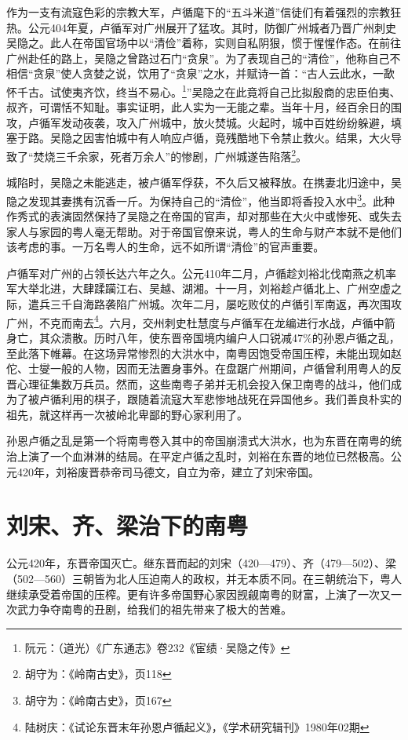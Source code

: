 作为一支有流寇色彩的宗教大军，卢循麾下的“五斗米道”信徒们有着强烈的宗教狂热。公元404年夏，卢循军对广州展开了猛攻。其时，防御广州城者乃晋广州刺史吴隐之。此人在帝国官场中以“清俭”着称，实则自私阴狠，惯于惺惺作态。在前往广州赴任的路上，吴隐之曾路过石门“贪泉”。为了表现自己的“清俭”，他称自己不相信“贪泉”使人贪婪之说，饮用了“贪泉”之水，并赋诗一首：“古人云此水，一歃怀千古。试使夷齐饮，终当不易心。\footnote{阮元：（道光）《广东通志》卷232《宦绩·吴隐之传》}”吴隐之在此竟将自己比拟殷商的忠臣伯夷、叔齐，可谓恬不知耻。事实证明，此人实为一无能之辈。当年十月，经百余日的围攻，卢循军发动夜袭，攻入广州城中，放火焚城。火起时，城中百姓纷纷躲避，填塞于路。吴隐之因害怕城中有人响应卢循，竟残酷地下令禁止救火。结果，大火导致了“焚烧三千余家，死者万余人”的惨剧，广州城遂告陷落\footnote{胡守为：《岭南古史》，页118}。

城陷时，吴隐之未能逃走，被卢循军俘获，不久后又被释放。在携妻北归途中，吴隐之发现其妻携有沉香一斤。为保持自己的“清俭”，他当即将香投入水中\footnote{胡守为：《岭南古史》，页167}。此种作秀式的表演固然保持了吴隐之在帝国的官声，却对那些在大火中或惨死、或失去家人与家园的粤人毫无帮助。对于帝国官僚来说，粤人的生命与财产本就不是他们该考虑的事。一万名粤人的生命，远不如所谓“清俭”的官声重要。

卢循军对广州的占领长达六年之久。公元410年二月，卢循趁刘裕北伐南燕之机率军大举北进，大肆蹂躏江右、吴越、湖湘。十一月，刘裕趁卢循北上、广州空虚之际，遣兵三千自海路袭陷广州城。次年二月，屡吃败仗的卢循引军南返，再次围攻广州，不克而南去\footnote{陆树庆：《试论东晋末年孙恩卢循起义》，《学术研究辑刊》1980年02期}。六月，交州刺史杜慧度与卢循军在龙编进行水战，卢循中箭身亡，其众溃散。历时八年，使东晋帝国境内编户人口锐减47\%的孙恩卢循之乱，至此落下帷幕。在这场异常惨烈的大洪水中，南粤因饱受帝国压榨，未能出现如赵佗、士燮一般的人物，因而无法置身事外。在盘踞广州期间，卢循曾利用粤人的反晋心理征集数万兵员。然而，这些南粤子弟并无机会投入保卫南粤的战斗，他们成为了被卢循利用的棋子，跟随着流寇大军悲惨地战死在异国他乡。我们善良朴实的祖先，就这样再一次被岭北卑鄙的野心家利用了。

孙恩卢循之乱是第一个将南粤卷入其中的帝国崩溃式大洪水，也为东晋在南粤的统治上演了一个血淋淋的结局。在平定卢循之乱时，刘裕在东晋的地位已然极高。公元420年，刘裕废晋恭帝司马德文，自立为帝，建立了刘宋帝国。

\section{刘宋、齐、梁治下的南粤}

公元420年，东晋帝国灭亡。继东晋而起的刘宋（420—479）、齐（479—502）、梁（502—560）三朝皆为北人压迫南人的政权，并无本质不同。在三朝统治下，粤人继续承受着帝国的压榨。更有许多帝国野心家因觊觎南粤的财富，上演了一次又一次武力争夺南粤的丑剧，给我们的祖先带来了极大的苦难。

